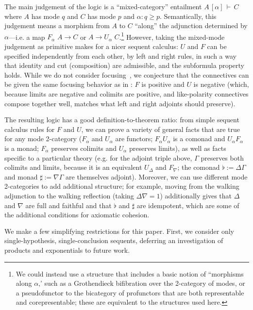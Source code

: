 \documentclass{drl-common/llncs}
\newcommand\F[2]{\ensuremath{F_{#1} \,\, #2}}
\newcommand\U[2]{\ensuremath{U_{#1} \,\, #2}}
\newcommand\seq[3]{\ensuremath{#1 \, [ #2 ] \, \vdash \, #3}}
\begin{document}
The main judgement of the logic is a ``mixed-category'' entailment
\seq{A}{\alpha}{C} where $A$ has mode $q$ and $C$ has mode $p$
and $\alpha : q \ge p$.  Semantically, this judgement means a morphism
from $A$ to $C$ ``along'' the adjunction determined by $\alpha$---i.e. a
map $\F \alpha A \to C$ or $A \to \U \alpha C$.\footnote{We could instead
  use a structure that includes a basic notion of ``morphisms along
  $\alpha$,' such as a Grothendieck bifibration over the 2-category of
  modes, or a pseudofunctor to the bicategory of profunctors that are
  both representable and corepresentable; these are equivalent to the
  structures used here.}  However, taking the mixed-mode judgement as
primitive makes for a nicer sequent calculus: $U$ and $F$ can be
specified independently from each other, by left and right rules, in
such a way that identity and cut (composition) are admissible, and the
subformula property holds.  While we do not consider
focusing~\citep{andreoli92focus}, we conjecture that the connectives can
be given the same focusing behavior as in \citep{reed09adjoint}: $F$ is
positive and $U$ is negative (which, because limits are negative and
colimits are positive, and like-polarity connectives compose together
well, matches what left and right adjoints should preserve).

The resulting logic has a good definition-to-theorem ratio: from 
simple sequent calculus rules for $F$ and $U$, we can prove a variety of
general facts that are true for any mode 2-category ($F_\alpha$ and
$U_\alpha$ are functors; $F_\alpha U_\alpha$ is a comonad and $U_\alpha
F_\alpha$ is a monad; $F_\alpha$ preserves colimits and $U_\alpha$
preserves limits), as well as facts specific to a particular theory
(e.g. for the adjoint triple above, $\Gamma$ preserves both colimits
and limits, because it is an equivalent $U_\Delta$ and $F_\nabla$; the
comonad $\flat := \Delta\Gamma$ and monad $\sharp := \nabla\Gamma$ are
themselves adjoint).  Moreover, we can use different mode 2-categories
to add additional structure; for example, moving from the walking
adjunction to the walking reflection (taking $\Delta \nabla = 1$)
additionally gives that $\Delta$ and $\nabla$ are full and faithful and
that $\flat$ and $\sharp$ are idempotent, which are some of the
additional conditions for axiomatic cohesion.

We make a few simplifying restrictions for this paper. First, we
consider only single-hypothesis, single-conclusion sequents, deferring
an investigation of products and exponentials to future work.
\end{document}
